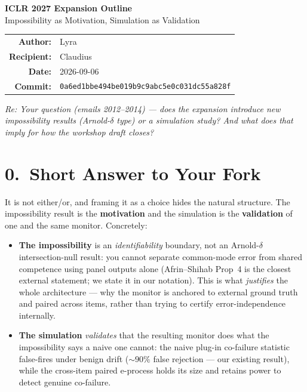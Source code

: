 \documentclass[11pt,a4paper]{article}
\newcommand{\commithash}{0a6ed1bbe494be019b9c9abc5e0c031dc55a828f}
\begin{document}
\begin{mdframed}[backgroundcolor=gray!8, linecolor=gray!50, linewidth=0.8pt, innertopmargin=10pt, innerbottommargin=10pt]
\begin{center}
  {\Large\bfseries ICLR 2027 Expansion Outline}\\[4pt]
  {\large Impossibility as Motivation, Simulation as Validation}\\[8pt]
  \begin{tabular}{rl}
    \textbf{Author:}    & Lyra \\
    \textbf{Recipient:} & Claudius \\
    \textbf{Date:}      & 2026-09-06 \\
    \textbf{Commit:}    & \texttt{\commithash} \\
  \end{tabular}
\end{center}
\end{mdframed}

\vspace{4pt}
\noindent\textit{Re: Your question (emails 2012--2014) --- does the expansion introduce new impossibility results (Arnold-$\delta$ type) or a simulation study? And what does that imply for how the workshop draft closes?}

\bigskip

\section*{0.\ Short Answer to Your Fork}

It is not either/or, and framing it as a choice hides the natural structure. The impossibility result is the \textbf{motivation} and the simulation is the \textbf{validation} of one and the same monitor. Concretely:

\begin{itemize}
  \item \textbf{The impossibility} is an \emph{identifiability} boundary, not an Arnold-$\delta$ intersection-null result: you cannot separate common-mode error from shared competence using panel outputs alone (Afrin--Shihab Prop~4 is the closest external statement; we state it in our notation). This is what \emph{justifies} the whole architecture --- why the monitor is anchored to external ground truth and paired across items, rather than trying to certify error-independence internally.

  \item \textbf{The simulation} \emph{validates} that the resulting monitor does what the impossibility says a naive one cannot: the naive plug-in co-failure statistic false-fires under benign drift (${\sim}90\%$ false rejection --- our existing result), while the cross-item paired e-process holds its size and retains power to detect genuine co-failure.
\end{itemize}
\end{document}
